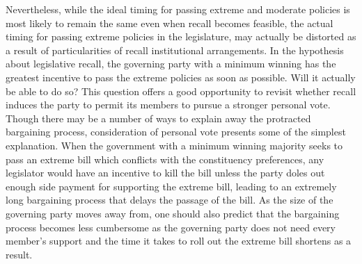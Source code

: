 \documentclass{article}
\begin{document}
		Nevertheless,
		while the ideal timing for passing extreme and moderate policies
		is most likely to remain the same even
		when recall becomes feasible,
		the actual timing for passing extreme policies in the legislature,
		may actually be distorted as a result of particularities of recall institutional arrangements.
		In the hypothesis about legislative recall,
		the governing party with a minimum winning
		has the greatest incentive to pass the extreme policies as soon as possible.
		Will it actually be able to do so?
		This question offers a good opportunity
		to revisit whether recall induces the party
		to permit its members to pursue a stronger personal vote.
		Though there may be a number of ways to
		explain away the protracted bargaining process,
		consideration of personal vote presents some of the simplest explanation.
		When the government with a minimum winning majority
		seeks to pass an extreme bill which conflicts with
		the constituency preferences,
		any legislator would have an incentive
		to kill the bill
		unless the party doles out
		enough side payment for supporting the extreme bill,
		leading to an extremely long bargaining process
		that delays the passage of the bill.
		As the size of the governing party moves away from,
		one should also predict that the bargaining process becomes less cumbersome
		as the governing party does not need every member's support
		and the time it takes to roll out the extreme bill
		shortens as a result.
		
\end{document}
